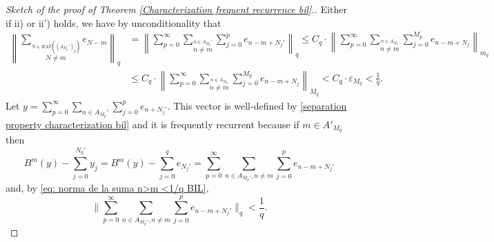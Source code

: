 \documentclass[11pt]{amsart}
\begin{document}
\begin{proof}[Sketch of the proof of Theorem \ref{Characterization frequent recurrence bil}.]
Either if ii) or ii') holds, we have by unconditionality that
\begin{align}
\nonumber \left\|\sum_{\overset{N\in RAT((A_{M_p}')_p)}{N\neq m}} e_{N-m}\right\|_q & =    \left\|\sum_{p=0}^\infty\sum_{\overset{n\in A_{M_{p}}'}{ n\neq m}}\sum_{j=0}^p e_{n-m+N_j'}\right\|_q \leq C_q\cdot \left\|\sum_{p=0}^\infty\sum_{\overset{n\in A_{M_p}}{n\neq m}}\sum_{j=0}^{M_p} e_{n-m+N_j}\right\|_{m_q}\\
 \label{eq: norma de la suma n>m <1/q BIL}   & \leq C_q\cdot\left\|\sum_{p=0}^\infty\sum_{\overset{n\in A_{M_p}}{n\neq m}}\sum_{j=0}^{M_p} e_{n-m+N_j}\right\|_{M_q}
     <C_q\cdot \varepsilon_{M_{q}}%
    <\frac{1}{q}. 
\end{align}
Let $y=\sum_{p=0}^\infty \sum_{n\in A_{M_p}'}\sum_{j=0}^p e_{n+N_j'}.$ This vector is well-defined by \eqref{separation property characterization bil} and it is frequently recurrent because if $m\in A'_{M_q}$ then
 $$B^m(y)-\sum_{j=0}^{N_q'} y_j=B^m(y)-\sum_{j=0}^q e_{N_{j}'}= \sum_{p=0}^\infty \sum_{n\in A_{M_p'}, n\neq m} \sum_{j=0}^p e_{n-m+N_j'}$$
 and,   by \eqref{eq: norma de la suma n>m <1/q BIL},
 $$
 \Bigg\|\sum_{p=0}^\infty \sum_{n\in A_{M_p'}, n\neq m} \sum_{j=0}^p e_{n-m+N_j'}\Bigg\|_q<\frac{1}{q}.
 $$



 

\end{proof}
\end{document}
